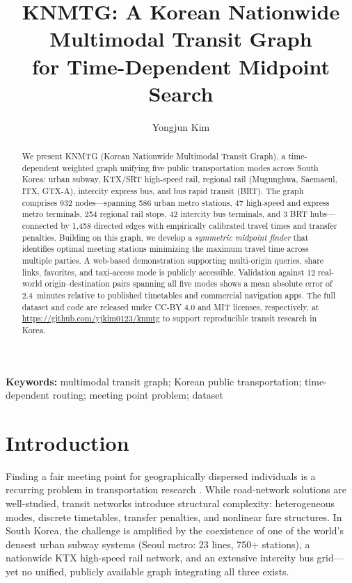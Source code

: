 \documentclass[12pt]{article}
\title{\textbf{KNMTG: A Korean Nationwide Multimodal Transit Graph\\
for Time-Dependent Midpoint Search}}
\author[1]{Yongjun Kim}
\affil[1]{Department of Software, Ajou University, Suwon 16499, Republic of Korea\\
\texttt{yjkim0123@ajou.ac.kr}}
\date{}
\begin{document}
\maketitle

\begin{abstract}
We present KNMTG (Korean Nationwide Multimodal Transit Graph), a
time-dependent weighted graph unifying five public transportation modes
across South Korea: urban subway, KTX/SRT high-speed rail, regional
rail (Mugunghwa, Saemaeul, ITX, GTX-A), intercity express bus, and
bus rapid transit (BRT). The graph comprises 932 nodes---spanning 586
urban metro stations, 47 high-speed and express metro terminals,
254 regional rail stops, 42 intercity bus terminals, and 3 BRT
hubs---connected by 1,458 directed edges with empirically calibrated
travel times and transfer penalties.
Building on this graph, we develop a \emph{symmetric midpoint finder}
that identifies optimal meeting stations minimizing the maximum travel
time across multiple parties. A web-based demonstration supporting
multi-origin queries, share links, favorites, and taxi-access mode is
publicly accessible. Validation against 12 real-world origin--destination pairs spanning
all five modes shows a mean absolute error of 2.4~minutes relative to
published timetables and commercial navigation apps.
The full dataset and code are released under CC-BY 4.0 and MIT
licenses, respectively, at \url{https://github.com/yjkim0123/knmtg}
to support reproducible transit research in Korea.
\end{abstract}

\textbf{Keywords:} multimodal transit graph; Korean public
transportation; time-dependent routing; meeting point problem; dataset

\section{Introduction}

Finding a fair meeting point for geographically dispersed individuals
is a recurring problem in transportation research \citep{yan2011,
mdm2018}. While road-network solutions are well-studied, transit
networks introduce structural complexity: heterogeneous modes, discrete
timetables, transfer penalties, and nonlinear fare structures. In South
Korea, the challenge is amplified by the coexistence of one of the
world's densest urban subway systems (Seoul metro: 23 lines, 750+
stations), a nationwide KTX high-speed rail network, and an extensive
intercity bus grid---yet no unified, publicly available graph
integrating all three exists.
\end{document}
